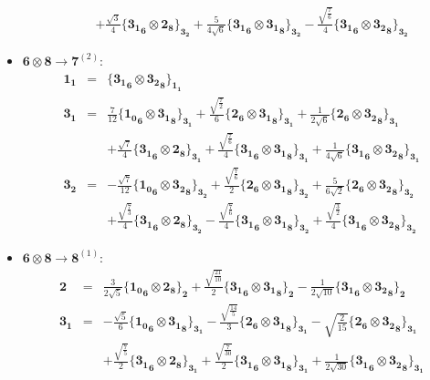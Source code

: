 \documentclass[english]{article}
\newcommand{\subcg}[3]{\big\{ {#1}\otimes{#2}\big\}^{}_{#3}}
\newcommand{\rep}[1]{\mathbf{#1}}
\begin{document}
\begin{itemize}
\begin{eqnarray*}
 & & +\frac{\sqrt{3}}{4}\subcg{\rep{3_1}_{\rep{6}}}{\rep{2}_{\rep{8}}}{\rep{3_2}}+\frac{5}{4 \sqrt{6}}\subcg{\rep{3_1}_{\rep{6}}}{\rep{3_1}_{\rep{8}}}{\rep{3_2}}-\frac{\sqrt{\frac{7}{6}}}{4}\subcg{\rep{3_1}_{\rep{6}}}{\rep{3_2}_{\rep{8}}}{\rep{3_2}}
\end{eqnarray*}
\item $\rep{6}\otimes\rep{8}\to\rep{7}^{(2)}$:
\begin{eqnarray*}
\rep{1_1} &=& \subcg{\rep{3_1}_{\rep{6}}}{\rep{3_2}_{\rep{8}}}{\rep{1_1}}
\\
\rep{3_1} &=& \frac{7}{12}\subcg{\rep{1_0}_{\rep{6}}}{\rep{3_1}_{\rep{8}}}{\rep{3_1}}+\frac{\sqrt{\frac{7}{2}}}{6}\subcg{\rep{2}_{\rep{6}}}{\rep{3_1}_{\rep{8}}}{\rep{3_1}}+\frac{1}{2 \sqrt{6}}\subcg{\rep{2}_{\rep{6}}}{\rep{3_2}_{\rep{8}}}{\rep{3_1}} \\ 
 & & +\frac{\sqrt{7}}{4}\subcg{\rep{3_1}_{\rep{6}}}{\rep{2}_{\rep{8}}}{\rep{3_1}}+\frac{\sqrt{\frac{7}{6}}}{4}\subcg{\rep{3_1}_{\rep{6}}}{\rep{3_1}_{\rep{8}}}{\rep{3_1}}+\frac{1}{4 \sqrt{6}}\subcg{\rep{3_1}_{\rep{6}}}{\rep{3_2}_{\rep{8}}}{\rep{3_1}}
\\
\rep{3_2} &=& -\frac{\sqrt{7}}{12}\subcg{\rep{1_0}_{\rep{6}}}{\rep{3_2}_{\rep{8}}}{\rep{3_2}}+\frac{\sqrt{\frac{7}{6}}}{2}\subcg{\rep{2}_{\rep{6}}}{\rep{3_1}_{\rep{8}}}{\rep{3_2}}+\frac{5}{6 \sqrt{2}}\subcg{\rep{2}_{\rep{6}}}{\rep{3_2}_{\rep{8}}}{\rep{3_2}} \\ 
 & & +\frac{\sqrt{\frac{7}{3}}}{4}\subcg{\rep{3_1}_{\rep{6}}}{\rep{2}_{\rep{8}}}{\rep{3_2}}-\frac{\sqrt{\frac{7}{6}}}{4}\subcg{\rep{3_1}_{\rep{6}}}{\rep{3_1}_{\rep{8}}}{\rep{3_2}}+\frac{\sqrt{\frac{3}{2}}}{4}\subcg{\rep{3_1}_{\rep{6}}}{\rep{3_2}_{\rep{8}}}{\rep{3_2}}
\end{eqnarray*}
\item $\rep{6}\otimes\rep{8}\to\rep{8}^{(1)}$:
\begin{eqnarray*}
\rep{2} &=& \frac{3}{2 \sqrt{5}}\subcg{\rep{1_0}_{\rep{6}}}{\rep{2}_{\rep{8}}}{\rep{2}}+\frac{\sqrt{\frac{21}{10}}}{2}\subcg{\rep{3_1}_{\rep{6}}}{\rep{3_1}_{\rep{8}}}{\rep{2}}-\frac{1}{2 \sqrt{10}}\subcg{\rep{3_1}_{\rep{6}}}{\rep{3_2}_{\rep{8}}}{\rep{2}}
\\
\rep{3_1} &=& -\frac{\sqrt{5}}{6}\subcg{\rep{1_0}_{\rep{6}}}{\rep{3_1}_{\rep{8}}}{\rep{3_1}}-\frac{\sqrt{\frac{14}{5}}}{3}\subcg{\rep{2}_{\rep{6}}}{\rep{3_1}_{\rep{8}}}{\rep{3_1}}-\sqrt{\frac{2}{15}}\subcg{\rep{2}_{\rep{6}}}{\rep{3_2}_{\rep{8}}}{\rep{3_1}} \\ 
 & & +\frac{\sqrt{\frac{7}{5}}}{2}\subcg{\rep{3_1}_{\rep{6}}}{\rep{2}_{\rep{8}}}{\rep{3_1}}+\frac{\sqrt{\frac{7}{30}}}{2}\subcg{\rep{3_1}_{\rep{6}}}{\rep{3_1}_{\rep{8}}}{\rep{3_1}}+\frac{1}{2 \sqrt{30}}\subcg{\rep{3_1}_{\rep{6}}}{\rep{3_2}_{\rep{8}}}{\rep{3_1}}

\end{eqnarray*}
\end{itemize}
\end{document}
